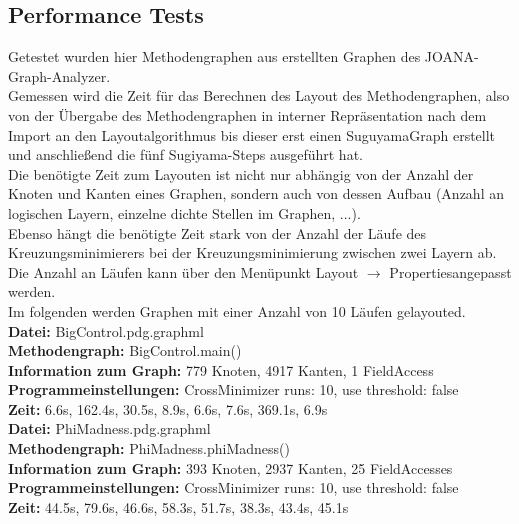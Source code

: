 \subsection{Performance Tests}
Getestet wurden hier Methodengraphen aus erstellten Graphen des JOANA-Graph-Analyzer.\\
Gemessen wird die Zeit für das Berechnen des Layout des Methodengraphen, also von der Übergabe des Methodengraphen in interner Repräsentation nach dem Import an den Layoutalgorithmus bis dieser erst einen SuguyamaGraph erstellt und anschließend die fünf Sugiyama-Steps ausgeführt hat.\\
Die benötigte Zeit zum Layouten ist nicht nur abhängig von der Anzahl der Knoten und Kanten eines Graphen, sondern auch von dessen Aufbau (Anzahl an logischen Layern, einzelne dichte Stellen im Graphen, ...).\\
Ebenso hängt die benötigte Zeit stark von der Anzahl der Läufe des Kreuzungsminimierers bei der Kreuzungsminimierung zwischen zwei Layern ab. Die Anzahl an Läufen kann über den Menüpunkt \glqq{}Layout $\to$ Properties\grqq angepasst werden.\\
Im folgenden werden Graphen mit einer Anzahl von 10 Läufen gelayouted.\\

\textbf{Datei: }BigControl.pdg.graphml\\
\textbf{Methodengraph: }BigControl.main()\\
\textbf{Information zum Graph: }779 Knoten, 4917 Kanten, 1 FieldAccess\\
\textbf{Programmeinstellungen: }CrossMinimizer runs: 10, use threshold: false\\
\textbf{Zeit: }6.6s, 162.4s, 30.5s, 8.9s, 6.6s, 7.6s, 369.1s, 6.9s \\

\textbf{Datei: }PhiMadness.pdg.graphml\\
\textbf{Methodengraph: }PhiMadness.phiMadness()\\
\textbf{Information zum Graph: }393 Knoten, 2937 Kanten, 25 FieldAccesses\\
\textbf{Programmeinstellungen: }CrossMinimizer runs: 10, use threshold: false\\
\textbf{Zeit: }44.5s, 79.6s, 46.6s, 58.3s, 51.7s, 38.3s, 43.4s, 45.1s\\




